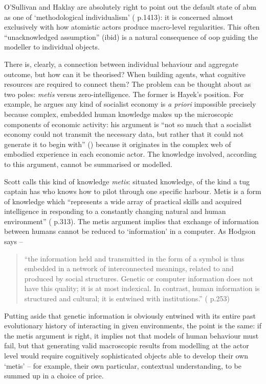 O'Sullivan and Haklay are absolutely right to point out the default state of \gls{abm} as one of `methodological individualism' (\citealt{osullivan_agent-based_2000} p.1413): it is concerned almost exclusively with how atomistic actors produce macro-level regularities. This often ``unacknowledged assumption'' (ibid) is a natural consequence of \gls{oop} guiding the modeller to individual objects.

There is, clearly, a connection between individual behaviour and aggregate outcome, but how can it be theorised? When building agents, what cognitive resources are required to connect them? The problem can be thought about as two poles: \emph{metis} versus zero-intelligence. The former is Hayek's position. For example, he argues any kind of socialist economy is \emph{a priori} impossible precisely because complex, embedded human knowledge makes up the microscopic components of economic activity: his argument is ``not so much that a socialist economy could not transmit the necessary data, but rather that it could not generate it to begin with'' (\citealt{chamberlain_socialist_1998}) because it originates in the complex web of embodied experience in each economic actor. The knowledge involved, according to this argument, cannot be summarised or modelled. 

Scott calls this kind of knowledge \emph{metis}: situated knowledge, of the kind a tug captain has who knows how to pilot through one specific harbour. Metis is a form of knowledge which ``represents a wide array of practical skills and acquired intelligence in responding to a constantly changing natural and human environment'' (\citealt{scott_seeing_1998} p.313). The metis argument implies that exchange of information between humans cannot be reduced to `information' in a computer. As Hodgson says –

\begin{quote}
``the information held and transmitted in the form of a symbol is thus embedded in a network of interconnected meanings, related to and produced by social structures.  Genetic or computer information does not have this quality; it is at most indexical. In contrast, human information is structured and cultural; it is entwined with institutions.'' (\citealt{hodgson_economics_1996} p.253)
\end{quote}

Putting aside that genetic information is obviously entwined with its entire past evolutionary history of interacting in given environments, the point is the same: if the metis argument is right, it implies not that models of human behaviour must fail, but that generating valid macroscopic results from modelling at the actor level would require cognitively sophisticated objects able to develop their own `metis' – for example, their own particular, contextual understanding, to be summed up in a choice of price.

